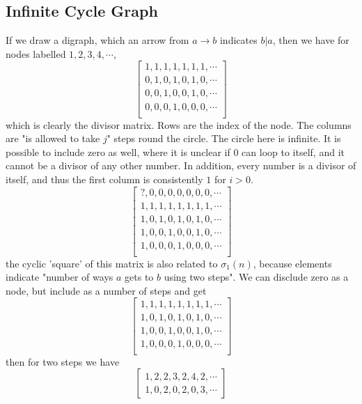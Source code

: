 \documentclass{article}
\begin{document}
\subsection{Infinite Cycle Graph}
If we draw a digraph, which an arrow from $a \to b$ indicates $b|a$, then we have for nodes labelled $1,2,3,4,\cdots$, 
$$
\begin{bmatrix}
1,1,1,1,1,1,1,\cdots \\
0,1,0,1,0,1,0,\cdots \\
0,0,1,0,0,1,0,\cdots \\
0,0,0,1,0,0,0,\cdots \\
\end{bmatrix}
$$
which is clearly the divisor matrix. Rows are the index of the node. The columns are "is allowed to take $j$" steps round the circle. The circle here is infinite. It is possible to include zero as well, where it is unclear if $0$ can loop to itself, and it cannot be a divisor of any other number. In addition, every number is a divisor of itself, and thus the first column is consistently $1$ for $i>0$.
$$
\begin{bmatrix}
?,0,0,0,0,0,0,0,\cdots \\
1,1,1,1,1,1,1,1,\cdots \\
1,0,1,0,1,0,1,0,\cdots \\
1,0,0,1,0,0,1,0,\cdots \\
1,0,0,0,1,0,0,0,\cdots \\
\end{bmatrix}
$$
the cyclic 'square' of this matrix is also related to $\sigma_1(n)$, because elements indicate "number of ways $a$ gets to $b$ using two steps". We can disclude zero as a node, but include as a number of steps and get
$$
\begin{bmatrix}
1,1,1,1,1,1,1,1,\cdots \\
1,0,1,0,1,0,1,0,\cdots \\
1,0,0,1,0,0,1,0,\cdots \\
1,0,0,0,1,0,0,0,\cdots \\
\end{bmatrix}
$$
then for two steps we have 
$$
\begin{bmatrix}
1,2,2,3,2,4,2, \cdots \\
1,0,2,0,2,0,3, \cdots
\end{bmatrix}
$$




{}

\end{document}
